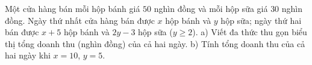 \begin{bt}%
	Một cửa hàng bán mỗi hộp bánh giá $50$ nghìn đồng và mỗi hộp sữa giá $30$ nghìn đồng. Ngày thứ nhất cửa hàng bán được $x$ hộp bánh và $y$ hộp sữa; ngày thứ hai bán được $x + 5$ hộp bánh và $2y - 3$ hộp sữa ($y \ge 2$).
a) Viết đa thức thu gọn biểu thị tổng doanh thu (nghìn đồng) của cả hai ngày.
b) Tính tổng doanh thu của cả hai ngày khi $x = 10$, $y = 5$.
\end{bt}
